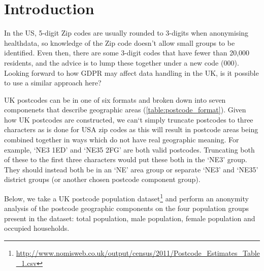\documentclass[12pt, a4paper]{article}
\title{\mytitle}
\author{\myauthor}
\date{\mydate}
\begin{document}
\maketitle

\section{Introduction}

In the US, 5-digit Zip codes are usually rounded to 3-digits when anonymising healthdata, so knowledge of the Zip code doesn’t allow small groups to be identified.  Even then, there are some 3-digit codes that have fewer than 20,000 residents, and the advice is to lump these together under a new code (000). Looking forward to how GDPR may affect data handling in the UK, is it possible to use a similar approach here?

UK postcodes can be in one of six formats and broken down into seven componenets that describe geographic areas (\cref{table:postcode_format}). Given how UK postcodes are constructed, we can`t simply truncate postcodes to three characters as is done for USA zip codes as this will result in postcode areas being combined together in ways which do not have real geographic meaning. For example, `NE3 1ED' and `NE35 2FG' are both valid postcodes. Truncating both of these to the first three characters would put these both in the `NE3' group. They should instead both be in an `NE' area group or separate `NE3' and `NE35' district groups (or another chosen postcode component group).

Below, we take a UK postcode population dataset\footnote{\url{http://www.nomisweb.co.uk/output/census/2011/Postcode_Estimates_Table_1.csv}} and perform an anonymity analysis of the postcode geographic components on the four population groups present in the dataset: total population, male population, female population and occupied households.
\end{document}
